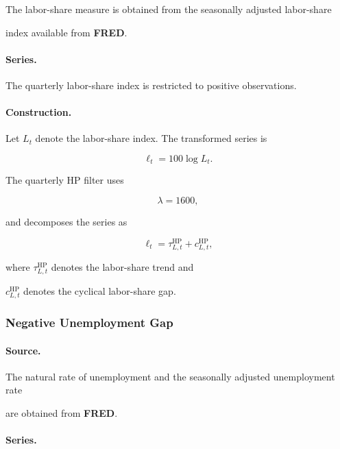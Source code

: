 \documentclass[11pt]{article}
\begin{document}
The labor-share measure is obtained from the seasonally adjusted labor-share

index available from \textbf{FRED}.

\paragraph{Series.}

The quarterly labor-share index is restricted to positive observations.

\paragraph{Construction.}

Let $L_t$ denote the labor-share index. The transformed series is

\begin{equation}
\ell_t
=
100\log L_t.
\end{equation}

The quarterly HP filter uses

\begin{equation}
\lambda=1600,
\end{equation}

and decomposes the series as

\begin{equation}
\ell_t
=
\tau_{L,t}^{\mathrm{HP}}
+
c_{L,t}^{\mathrm{HP}},
\end{equation}

where $\tau_{L,t}^{\mathrm{HP}}$ denotes the labor-share trend and

$c_{L,t}^{\mathrm{HP}}$ denotes the cyclical labor-share gap.



\subsubsection{Negative Unemployment Gap}

\paragraph{Source.}

The natural rate of unemployment and the seasonally adjusted unemployment rate

are obtained from \textbf{FRED}.

\paragraph{Series.}
\end{document}
